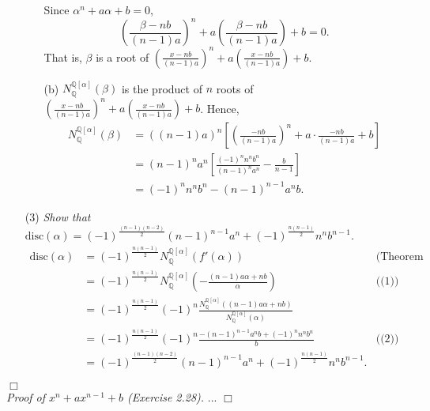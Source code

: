 \documentclass{article}
\begin{document}
\begin{enumerate}
\begin{enumerate}
  Since $\alpha^n + a\alpha + b = 0$,
  $$\left( \frac{\beta-nb}{(n-1)a} \right)^n
    + a\left( \frac{\beta-nb}{(n-1)a} \right) + b = 0.$$
  That is, $\beta$ is a root of
  $\left( \frac{x-nb}{(n-1)a} \right)^n + a\left( \frac{x-nb}{(n-1)a} \right) + b$.
  \item[(b)]
  $N_{\mathbb{Q}}^{\mathbb{Q}[\alpha]}(\beta)$ is the product of $n$ roots of
  $\left( \frac{x-nb}{(n-1)a} \right)^n + a\left( \frac{x-nb}{(n-1)a} \right) + b$.
  Hence,
  \begin{align*}
  N_{\mathbb{Q}}^{\mathbb{Q}[\alpha]}(\beta)
  &= ((n-1)a)^n\left[ \left(\frac{-nb}{(n-1)a}\right)^n
    + a \cdot \frac{-nb}{(n-1)a} + b \right] \\
  &= (n-1)^n a^n\left[ \frac{(-1)^n n^n b^n}{(n-1)^n a^n} - \frac{b}{n-1} \right] \\
  &= (-1)^n n^n b^n - (n-1)^{n-1} a^n b.
  \end{align*}
  \end{enumerate}
\item[(3)]
\emph{Show that $\text{disc}(\alpha) = (-1)^{\frac{(n-1)(n-2)}{2}} (n-1)^{n-1}a^n
  + (-1)^{\frac{n(n-1)}{2}} n^n b^{n-1}$.}
\begin{align*}
\text{disc}(\alpha)
&= (-1)^{\frac{n(n-1)}{2}} N_{\mathbb{Q}}^{\mathbb{Q}[\alpha]}(f'(\alpha))
  &\text{(Theorem 2.8)} \\
&= (-1)^{\frac{n(n-1)}{2}} N_{\mathbb{Q}}^{\mathbb{Q}[\alpha]}
  \left( -\frac{(n-1)a\alpha+nb}{\alpha} \right)
  &\text{((1))} \\
&= (-1)^{\frac{n(n-1)}{2}}(-1)^n
  \frac{N_{\mathbb{Q}}^{\mathbb{Q}[\alpha]}((n-1)a\alpha+nb)}
  {N_{\mathbb{Q}}^{\mathbb{Q}[\alpha]}(\alpha)} \\
&= (-1)^{\frac{n(n-1)}{2}}(-1)^n \frac{-(n-1)^{n-1}a^nb+(-1)^n n^n b^n}{b}
  &\text{((2))} \\
&= (-1)^{\frac{(n-1)(n-2)}{2}} (n-1)^{n-1}a^n
  + (-1)^{\frac{n(n-1)}{2}} n^n b^{n-1}.
\end{align*}
\end{enumerate}
$\Box$ \\

\emph{Proof of $x^n + ax^{n-1} + b$ (Exercise 2.28).}
...
$\Box$ \\\\



\end{document}
